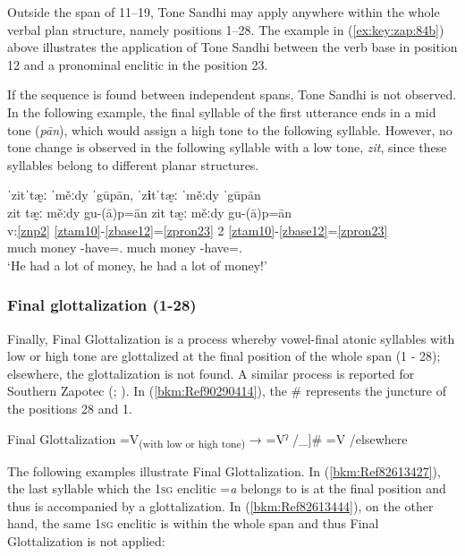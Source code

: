 \documentclass[output=paper]{langscibook}
\begin{document}
Outside the span of 11--19, Tone Sandhi may apply anywhere within the whole verbal plan structure, namely positions 1--28. The example in (\ref{ex:key:zap:84b}) above illustrates the application of Tone Sandhi between the verb base in position 12 and a pronominal enclitic in the position 23. 

If the sequence is found between independent spans, Tone Sandhi is not observed. In the following example, the final syllable of the first utterance ends in a mid tone (\textit{pān}), which would assign a high tone to the following syllable. However, no tone change is observed in the following syllable with a low tone, \textit{zit}, since these syllables belong to different planar structures.

\ea\label{ex:key:zap:92}
{ˈzitˈtæ̰ː ˈměːdy ˈgūpān, ˈz\textbf{i}tˈtæ̰ː ˈměːdy ˈgūpān}\\
\glll zit tæ̰ː měːdy  gu-(ā)p=ān zit tæ̰ː měːdy gu-(ā)p=ān\\
v:\ref{znp2} {} {} \ref{ztam10}-\ref{zbase12}=\ref{zpron23} 2 {} {} \ref{ztam10}-\ref{zbase12}=\ref{zpron23} \\
much \Intens{} money \Compl-have=\Third\Sg.\For{} much \Intens{} money \Compl-have=\Third\Sg.\For{}\\
\glt `He had a lot of money, he had a lot of money!'
\z

\subsubsection{Final glottalization (1-28)}\label{sec:key:4.2.7}

Finally, Final Glottalization is a process whereby vowel-final atonic syllables with low or high tone are glottalized at the final position of the whole span (1 - 28); elsewhere, the glottalization is not found. A similar process is reported for Southern Zapotec (\citealt{Beam-de-Azcona2004}; \citealt{Hernandez-Luna2021}). In (\ref{bkm:Ref90290414}), the \# represents the juncture of the positions 28 and 1. 

\newpage
\ea\label{bkm:Ref90290414} 
Final Glottalization
  \ea  =V\textsubscript{(with low or high tone)} → =Vˀ /\_]\#
  \ex  =V /elsewhere 
  \z
\z 

The following examples illustrate Final Glottalization. In (\ref{bkm:Ref82613427}), the last syllable which the 1\textsc{sg} enclitic =\textit{a} belongs to is at the final position and thus is accompanied by a glottalization. In (\ref{bkm:Ref82613444}), on the other hand, the same 1\textsc{sg} enclitic is within the whole span and thus Final Glottalization is not applied:
\end{document}
